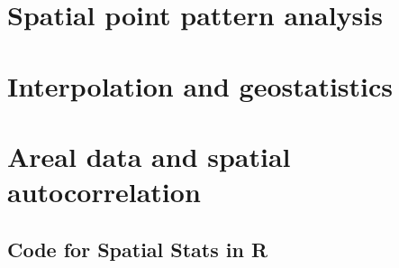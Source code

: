 \section{Spatial point pattern analysis}
\section{Interpolation and geostatistics}
\section{Areal data and spatial autocorrelation}

\begin{subappendices}
\section{Code for Spatial Stats in R}


\renewcommand\bibname{Further reading}



\end{subappendices} 
